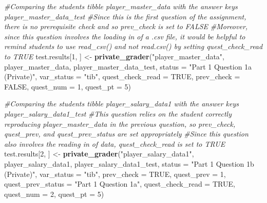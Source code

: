 \documentclass[
  12pt,
]{book}
\newenvironment{Shaded}{\begin{snugshade}}{\end{snugshade}}
\newcommand{\AttributeTok}[1]{\textcolor[rgb]{0.13,0.29,0.53}{#1}}
\newcommand{\CommentTok}[1]{\textcolor[rgb]{0.56,0.35,0.01}{\textit{#1}}}
\newcommand{\ConstantTok}[1]{\textcolor[rgb]{0.56,0.35,0.01}{#1}}
\newcommand{\DecValTok}[1]{\textcolor[rgb]{0.00,0.00,0.81}{#1}}
\newcommand{\FunctionTok}[1]{\textcolor[rgb]{0.13,0.29,0.53}{\textbf{#1}}}
\newcommand{\NormalTok}[1]{#1}
\newcommand{\OtherTok}[1]{\textcolor[rgb]{0.56,0.35,0.01}{#1}}
\newcommand{\StringTok}[1]{\textcolor[rgb]{0.31,0.60,0.02}{#1}}
\begin{document}
\begin{Shaded}
\begin{Highlighting}[]
\CommentTok{\#Comparing the student\textquotesingle{}s tibble \textasciigrave{}player\_master\_data\textasciigrave{} with the answer key\textquotesingle{}s \textasciigrave{}player\_master\_data\_test\textasciigrave{} }
\CommentTok{\#Since this is the first question of the assignment, there is no prerequisite check and so \textasciigrave{}prev\_check\textasciigrave{} is set to \textasciigrave{}FALSE\textasciigrave{}}
\CommentTok{\#Moreover, since this question involves the loading in of a .csv file, it would be helpful to remind students to use \textasciigrave{}read\_csv()\textasciigrave{} and not \textasciigrave{}read.csv()\textasciigrave{} by setting \textasciigrave{}quest\_check\_read\textasciigrave{} to \textasciigrave{}TRUE\textasciigrave{}}
\NormalTok{test.results[}\DecValTok{1}\NormalTok{, ] }\OtherTok{\textless{}{-}} \FunctionTok{private\_grader}\NormalTok{(}\StringTok{"player\_master\_data"}\NormalTok{, player\_master\_data, player\_master\_data\_test,}
                                    \AttributeTok{status =} \StringTok{"Part 1 Question 1a (Private)"}\NormalTok{, }\AttributeTok{var\_status =} \StringTok{"tib"}\NormalTok{,}
                                    \AttributeTok{quest\_check\_read =} \ConstantTok{TRUE}\NormalTok{, }\AttributeTok{prev\_check =} \ConstantTok{FALSE}\NormalTok{, }\AttributeTok{quest\_num =} \DecValTok{1}\NormalTok{, }\AttributeTok{quest\_pt =} \DecValTok{5}\NormalTok{)}

\CommentTok{\#Comparing the student\textquotesingle{}s tibble \textasciigrave{}player\_salary\_data1\textasciigrave{} with the answer key\textquotesingle{}s \textasciigrave{}player\_salary\_data1\_test\textasciigrave{} }
\CommentTok{\#This question relies on the student correctly reproducing \textasciigrave{}player\_master\_data\textasciigrave{} in the previous question, so \textasciigrave{}prev\_check\textasciigrave{}, \textasciigrave{}quest\_prev\textasciigrave{}, and \textasciigrave{}quest\_prev\_status\textasciigrave{} are set appropriately}
\CommentTok{\#Since this question also involves the reading in of data, \textasciigrave{}quest\_check\_read\textasciigrave{} is set to TRUE}
\NormalTok{test.results[}\DecValTok{2}\NormalTok{, ] }\OtherTok{\textless{}{-}} \FunctionTok{private\_grader}\NormalTok{(}\StringTok{"player\_salary\_data1"}\NormalTok{, player\_salary\_data1, player\_salary\_data1\_test,}
                                    \AttributeTok{status =} \StringTok{"Part 1 Question 1b (Private)"}\NormalTok{, }\AttributeTok{var\_status =} \StringTok{"tib"}\NormalTok{,}
                                    \AttributeTok{prev\_check =} \ConstantTok{TRUE}\NormalTok{, }\AttributeTok{quest\_prev =} \DecValTok{1}\NormalTok{, }\AttributeTok{quest\_prev\_status =} \StringTok{"Part 1 Question 1a"}\NormalTok{,}
                                    \AttributeTok{quest\_check\_read =} \ConstantTok{TRUE}\NormalTok{, }\AttributeTok{quest\_num =} \DecValTok{2}\NormalTok{, }\AttributeTok{quest\_pt =} \DecValTok{5}\NormalTok{)}
\end{Highlighting}
\end{Shaded}
\end{document}
